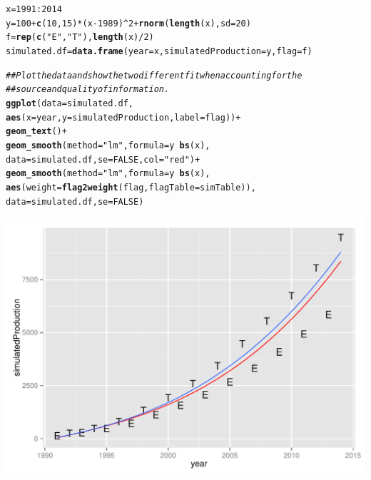 \documentclass[nojss]{jss}\usepackage[]{graphicx}\usepackage[]{color}
\makeatletter
\def\maxwidth{ %
  \ifdim\Gin@nat@width>\linewidth
    \linewidth
  \else
    \Gin@nat@width
  \fi
}
\newcommand{\hlnum}[1]{\textcolor[rgb]{0.686,0.059,0.569}{#1}}%
\newcommand{\hlstr}[1]{\textcolor[rgb]{0.192,0.494,0.8}{#1}}%
\newcommand{\hlcom}[1]{\textcolor[rgb]{0.678,0.584,0.686}{\textit{#1}}}%
\newcommand{\hlopt}[1]{\textcolor[rgb]{0,0,0}{#1}}%
\newcommand{\hlstd}[1]{\textcolor[rgb]{0.345,0.345,0.345}{#1}}%
\newcommand{\hlkwb}[1]{\textcolor[rgb]{0.69,0.353,0.396}{#1}}%
\newcommand{\hlkwc}[1]{\textcolor[rgb]{0.333,0.667,0.333}{#1}}%
\newcommand{\hlkwd}[1]{\textcolor[rgb]{0.737,0.353,0.396}{\textbf{#1}}}%
\newenvironment{kframe}{%
 \def\at@end@of@kframe{}%
 \ifinner\ifhmode%
  \def\at@end@of@kframe{\end{minipage}}%
  \begin{minipage}{\columnwidth}%
 \fi\fi%
 \def\FrameCommand##1{\hskip\@totalleftmargin \hskip-\fboxsep
 \colorbox{shadecolor}{##1}\hskip-\fboxsep
     \hskip-\linewidth \hskip-\@totalleftmargin \hskip\columnwidth}%
 \MakeFramed {\advance\hsize-\width
   \@totalleftmargin\z@ \linewidth\hsize
   \@setminipage}}%
 {\par\unskip\endMakeFramed%
 \at@end@of@kframe}
\newenvironment{knitrout}{}{} %
\makeatother
\begin{document}
\begin{knitrout}
\color{fgcolor}\begin{kframe}
\begin{alltt}
\hlstd{x} \hlkwb{=} \hlnum{1991}\hlopt{:}\hlnum{2014}
\hlstd{y} \hlkwb{=} \hlnum{100} \hlopt{+} \hlkwd{c}\hlstd{(}\hlnum{10}\hlstd{,} \hlnum{15}\hlstd{)} \hlopt{*} \hlstd{(x} \hlopt{-} \hlnum{1989}\hlstd{)}\hlopt{^}\hlnum{2} \hlopt{+} \hlkwd{rnorm}\hlstd{(}\hlkwd{length}\hlstd{(x),} \hlkwc{sd} \hlstd{=} \hlnum{20}\hlstd{)}
\hlstd{f} \hlkwb{=} \hlkwd{rep}\hlstd{(}\hlkwd{c}\hlstd{(}\hlstr{"E"}\hlstd{,} \hlstr{"T"}\hlstd{),} \hlkwd{length}\hlstd{(x)}\hlopt{/}\hlnum{2}\hlstd{)}
\hlstd{simulated.df} \hlkwb{=} \hlkwd{data.frame}\hlstd{(}\hlkwc{year} \hlstd{= x,} \hlkwc{simulatedProduction} \hlstd{= y,} \hlkwc{flag} \hlstd{= f)}

\hlcom{## Plot the data and show the two different fit when accounting for the }
\hlcom{## source and quality of information.}
\hlkwd{ggplot}\hlstd{(}\hlkwc{data} \hlstd{= simulated.df,}
       \hlkwd{aes}\hlstd{(}\hlkwc{x} \hlstd{= year,} \hlkwc{y} \hlstd{= simulatedProduction,} \hlkwc{label} \hlstd{= flag))} \hlopt{+}
    \hlkwd{geom_text}\hlstd{()} \hlopt{+}
    \hlkwd{geom_smooth}\hlstd{(}\hlkwc{method} \hlstd{=} \hlstr{"lm"}\hlstd{,} \hlkwc{formula} \hlstd{= y} \hlopt{~} \hlkwd{bs}\hlstd{(x),}
                \hlkwc{data} \hlstd{= simulated.df,} \hlkwc{se} \hlstd{=} \hlnum{FALSE}\hlstd{,} \hlkwc{col} \hlstd{=} \hlstr{"red"}\hlstd{)} \hlopt{+}
    \hlkwd{geom_smooth}\hlstd{(}\hlkwc{method} \hlstd{=} \hlstr{"lm"}\hlstd{,} \hlkwc{formula} \hlstd{= y} \hlopt{~} \hlkwd{bs}\hlstd{(x),}
                \hlkwd{aes}\hlstd{(}\hlkwc{weight} \hlstd{=} \hlkwd{flag2weight}\hlstd{(flag,} \hlkwc{flagTable} \hlstd{= simTable)),}
                \hlkwc{data} \hlstd{= simulated.df,} \hlkwc{se} \hlstd{=} \hlnum{FALSE}\hlstd{)}
\end{alltt}
\end{kframe}

{\centering \includegraphics[width=\maxwidth]{figure/simulated-example2} 

}



\end{knitrout}
\end{document}
